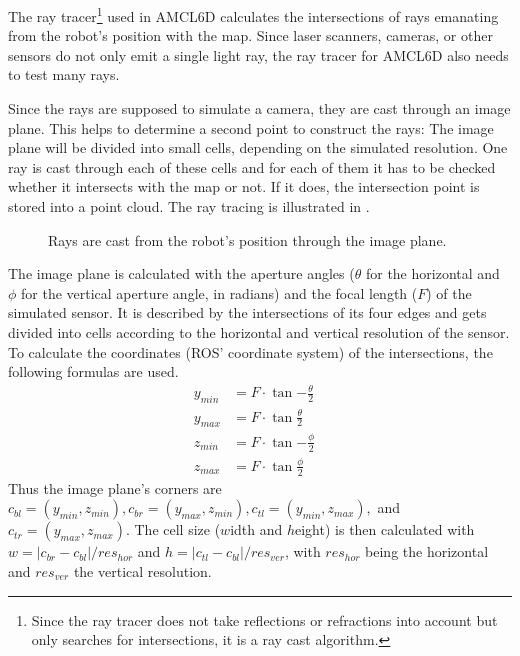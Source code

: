 \documentclass[Thesis.tex]{subfiles}
\begin{document}
The ray tracer\footnote{Since the ray tracer does not take reflections or refractions into account but only searches for intersections, it is a ray cast algorithm.} used in \gls{AMCL6D} calculates the intersections of rays emanating from the robot's position with the map. Since laser scanners, cameras, or other sensors do not only emit a single light ray, the ray tracer for \gls{AMCL6D} also needs to test many rays. 

Since the rays are supposed to simulate a camera, they are cast through an image plane. This helps to determine a second point to construct the rays: The image plane will be divided into small cells, depending on the simulated resolution. One ray is cast through each of these cells and for each of them it has to be checked whether it intersects with the map or not. If it does, the intersection point is stored into a point cloud. The ray tracing is illustrated in .
%
\begin{figure}[!htp]
  \caption{Rays are cast from the robot's position through the image plane.}
  \label{fig:raytrace_scheme}
\end{figure}
%
The image plane is calculated with the aperture angles ($\theta$ for the horizontal and $\phi$ for the vertical aperture angle, in radians) and the focal length ($F$) of the simulated sensor. It is described by the intersections of its four edges and gets divided into cells according to the horizontal and vertical resolution of the sensor. To calculate the coordinates (\gls{ROS}' coordinate system) of the intersections, the following formulas are used.
%
\begin{align}
y_{min} &= F \cdot \tan{-\frac{\theta}{2}} &\label{form:image_plane} \\
y_{max} &= F \cdot \tan{ \frac{\theta}{2}} &\\
z_{min} &= F \cdot \tan{-\frac{\phi}{2}} &\\
z_{max} &= F \cdot \tan{ \frac{\phi}{2}} &
\end{align}
%
Thus the image plane's corners are $c_{bl}=(y_{min}, z_{min}), c_{br}=(y_{max}, z_{min}), c_{tl}=(y_{min}, z_{max}),$ and $c_{tr}=(y_{max}, z_{max})$. The cell size ($w$idth and $h$eight) is then calculated with $w=|c_{br}-c_{bl}|/res_{hor}$ and $h=|c_{tl}-c_{bl}|/res_{ver}$, with $res_{hor}$ being the horizontal and $res_{ver}$ the vertical resolution.
\end{document}
